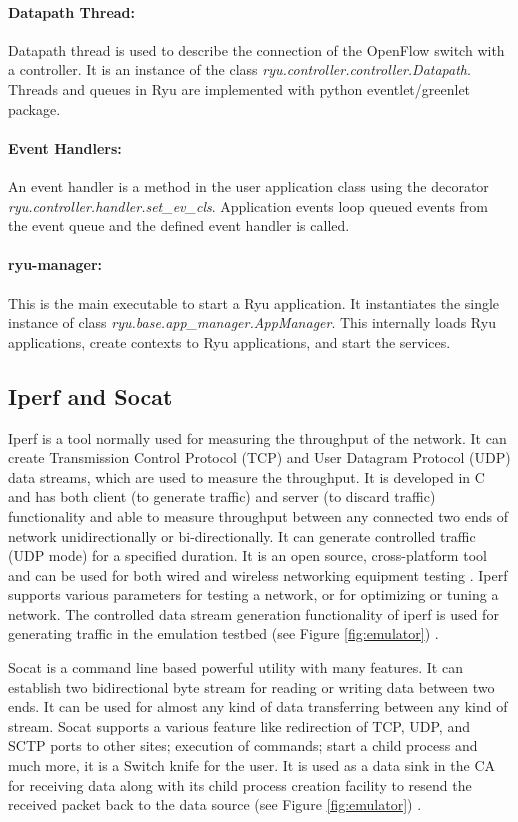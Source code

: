 \paragraph{Datapath Thread:}
Datapath thread is used to describe the connection of the OpenFlow switch with a controller. It is an instance of the class \textit{ryu.controller.controller.Datapath}. Threads and queues in Ryu are implemented with python eventlet/greenlet package.
\paragraph{Event Handlers:}
An event handler is a method in the user application class using the decorator \textit{ryu.controller.handler.set\_ev\_cls}. Application events loop queued events from the event queue and the defined event handler is called.
\paragraph{ryu-manager:}
This is the main executable to start a Ryu application. It instantiates the single instance of class \textit{ryu.base.app\_manager.AppManager}. This internally loads Ryu applications, create contexts to Ryu applications, and start the services.

\subsection{Iperf and Socat}
Iperf is a tool normally used for measuring the throughput of the network. It can create Transmission Control Protocol (TCP) and User Datagram Protocol (UDP) data streams, which are used to measure the throughput. It is developed in C and has both client (to generate traffic) and server (to discard traffic) functionality and able to measure throughput between any connected two ends of network unidirectionally or bi-directionally. It can generate controlled traffic (UDP mode) for a specified duration. It is an open source, cross-platform tool and can be used for both wired and wireless networking equipment testing \cite{iperf}. Iperf supports various parameters for testing a network, or for optimizing or tuning a network. The controlled data stream generation functionality of iperf is used for generating traffic in the emulation testbed (see Figure \ref{fig:emulator}) \cite{iperfman}.

Socat is a command line based powerful utility with many features. It can establish two bidirectional byte stream for reading or writing data between two ends. It can be used for almost any kind of data transferring between any kind of stream. Socat supports a various feature like redirection of TCP, UDP, and SCTP ports to other sites; execution of commands; start a child process and much more, it is a Switch knife for the user. It is used as a data sink in the CA for receiving data along with its child process creation facility to resend the received packet back to the data source (see Figure \ref{fig:emulator}) \cite{socatman}.

